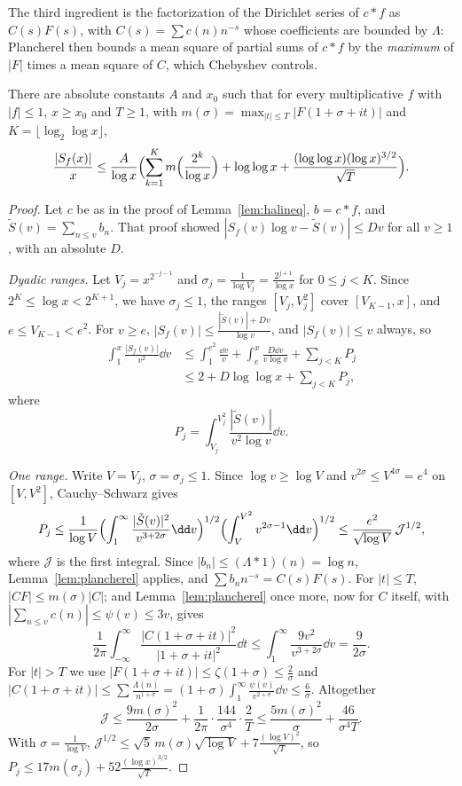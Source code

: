 The third ingredient is the factorization of the Dirichlet series of $c*f$ as $C(s)F(s)$, with $C(s)=\sum c(n)n^{-s}$ whose coefficients are bounded by $\Lambda$: Plancherel then bounds a mean square of partial sums of $c*f$ by the \emph{maximum} of $|F|$ times a mean square of $C$, which Chebyshev controls.

\begin{theorem}\label{thm:halaszineq}
There are absolute constants $A$ and $x_0$ such that for every multiplicative $f$ with $|f|\le1$, $x\ge x_0$ and $T\ge1$, with $m(\sigma)=\max_{|t|\le T}|F(1+\sigma+it)|$ and $K=\lfloor\log_2\log x\rfloor$,
\[
\frac{|S_f(x)|}x\le\frac A{\log x}\Bigl(\sum_{k=1}^Km\Bigl(\frac{2^k}{\log x}\Bigr)+\log\log x+\frac{(\log\log x)(\log x)^{3/2}}{\sqrt T}\Bigr).
\]
\end{theorem}
\begin{proof}
Let $c$ be as in the proof of Lemma~\ref{lem:halineq}, $b=c*f$, and $\tilde S(v)=\sum_{n\le v}b_n$. That proof showed $|S_f(v)\log v-\tilde S(v)|\le Dv$ for all $v\ge1$, with an absolute $D$.

\emph{Dyadic ranges.} Let $V_j=x^{2^{-j-1}}$ and $\sigma_j=\frac1{\log V_j}=\frac{2^{j+1}}{\log x}$ for $0\le j<K$. Since $2^K\le\log x<2^{K+1}$, we have $\sigma_j\le1$, the ranges $[V_j,V_j^2]$ cover $[V_{K-1},x]$, and $e\le V_{K-1}<e^2$. For $v\ge e$, $|S_f(v)|\le\frac{|\tilde S(v)|+Dv}{\log v}$, and $|S_f(v)|\le v$ always, so
\[
\begin{aligned}\int_1^x\frac{|S_f(v)|}{v^2}\dd v&\le\int_1^{e^2}\frac{\dd v}v+\int_e^x\frac{D\dd v}{v\log v}+\sum_{j<K}P_j\\&\le2+D\log\log x+\sum_{j<K}P_j,\end{aligned}
\]
where
\[
P_j=\int_{V_j}^{V_j^2}\frac{|\tilde S(v)|}{v^2\log v}\dd v.
\]

\emph{One range.} Write $V=V_j$, $\sigma=\sigma_j\le1$. Since $\log v\ge\log V$ and $v^{2\sigma}\le V^{4\sigma}=e^4$ on $[V,V^2]$, Cauchy--Schwarz gives
\[
P_j\le\frac1{\log V}\Bigl(\int_1^\infty\frac{|\tilde S(v)|^2}{v^{3+2\sigma}}\dd v\Bigr)^{1/2}\Bigl(\int_V^{V^2}v^{2\sigma-1}\dd v\Bigr)^{1/2}\le\frac{e^2}{\sqrt{\log V}}\,\mathcal J^{1/2},
\]
where $\mathcal J$ is the first integral. Since $|b_n|\le(\Lambda*1)(n)=\log n$, Lemma~\ref{lem:plancherel} applies, and $\sum b_nn^{-s}=C(s)F(s)$. For $|t|\le T$, $|CF|\le m(\sigma)|C|$; and Lemma~\ref{lem:plancherel} once more, now for $C$ itself, with $|\sum_{n\le v}c(n)|\le\psi(v)\le3v$, gives
\[
\frac1{2\pi}\int_{-\infty}^\infty\frac{|C(1+\sigma+it)|^2}{|1+\sigma+it|^2}\dd t\le\int_1^\infty\frac{9v^2}{v^{3+2\sigma}}\dd v=\frac9{2\sigma}.
\]
For $|t|>T$ we use $|F(1+\sigma+it)|\le\zeta(1+\sigma)\le\frac2\sigma$ and $|C(1+\sigma+it)|\le\sum\frac{\Lambda(n)}{n^{1+\sigma}}=(1+\sigma)\int_1^\infty\frac{\psi(v)}{v^{2+\sigma}}\dd v\le\frac6\sigma$. Altogether
\[
\mathcal J\le\frac{9m(\sigma)^2}{2\sigma}+\frac1{2\pi}\cdot\frac{144}{\sigma^4}\cdot\frac2T\le\frac{5m(\sigma)^2}\sigma+\frac{46}{\sigma^4T}.
\]
With $\sigma=\frac1{\log V}$, $\mathcal J^{1/2}\le\sqrt5\,m(\sigma)\sqrt{\log V}+7\frac{(\log V)^2}{\sqrt T}$, so $P_j\le17m(\sigma_j)+52\frac{(\log x)^{3/2}}{\sqrt T}$.


\end{proof}
